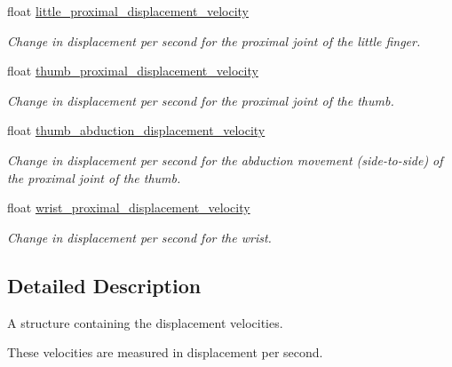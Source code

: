 \begin{DoxyCompactItemize}
\mbox{\label{struct_displacement_velocity_context_a10d34190a4e3b60cb5b6d0d62fd814ed}} 
float \hyperlink{struct_displacement_velocity_context_a10d34190a4e3b60cb5b6d0d62fd814ed}{little\+\_\+proximal\+\_\+displacement\+\_\+velocity}
\begin{DoxyCompactList}\small\item\em Change in displacement per second for the proximal joint of the little finger. \end{DoxyCompactList}\item 
\mbox{\label{struct_displacement_velocity_context_a99e39d1c770e27428d093760107d88b6}} 
float \hyperlink{struct_displacement_velocity_context_a99e39d1c770e27428d093760107d88b6}{thumb\+\_\+proximal\+\_\+displacement\+\_\+velocity}
\begin{DoxyCompactList}\small\item\em Change in displacement per second for the proximal joint of the thumb. \end{DoxyCompactList}\item 
\mbox{\label{struct_displacement_velocity_context_a86e7a904dcca609200a81d7521ef478c}} 
float \hyperlink{struct_displacement_velocity_context_a86e7a904dcca609200a81d7521ef478c}{thumb\+\_\+abduction\+\_\+displacement\+\_\+velocity}
\begin{DoxyCompactList}\small\item\em Change in displacement per second for the abduction movement (side-\/to-\/side) of the proximal joint of the thumb. \end{DoxyCompactList}\item 
\mbox{\label{struct_displacement_velocity_context_ae4b1bd881735fb98455c7c33cccbcdee}} 
float \hyperlink{struct_displacement_velocity_context_ae4b1bd881735fb98455c7c33cccbcdee}{wrist\+\_\+proximal\+\_\+displacement\+\_\+velocity}
\begin{DoxyCompactList}\small\item\em Change in displacement per second for the wrist. \end{DoxyCompactList}\end{DoxyCompactItemize}


\subsection{Detailed Description}
A structure containing the displacement velocities. 

These velocities are measured in displacement per second. 